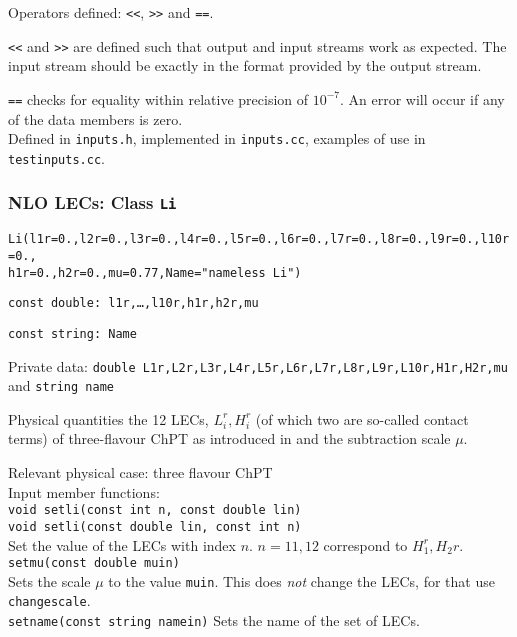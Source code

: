 \documentclass[12pt,a4paper]{article}
\newcommand{\mytt}[1]{\texttt{#1}}
\newcommand{\newfunction}[1]{\mytt{#1}\index{\mytt{#1}}}
\begin{document}
Operators defined: \newfunction{<<}, \newfunction{>>} and \newfunction{==}.

\mytt{<<} and \mytt{>>} are  defined such that output and input
streams work as expected. The input stream should be exactly in the format
provided by the output stream.

\mytt{==} checks for equality within relative precision of $10^{-7}$.
An error will occur if any of the data members is zero.\\

Defined in \mytt{inputs.h}, implemented in \mytt{inputs.cc},
examples of use in \mytt{testinputs.cc}.

\subsubsection{NLO LECs: Class \newfunction{Li}}

\mytt{Li(l1r=0.,l2r=0.,l3r=0.,l4r=0.,l5r=0.,l6r=0.,l7r=0.,l8r=0.,l9r=0.,l10r=0.,\\\hspace*{0.7cm}h1r=0.,h2r=0.,mu=0.77,Name="nameless Li")}

\mytt{const double: l1r,\ldots,l10r,h1r,h2r,mu}

\mytt{const string: Name}


Private data: \mytt{double L1r,L2r,L3r,L4r,L5r,L6r,L7r,L8r,L9r,L10r,H1r,H2r,mu}
and \mytt{string name}

Physical quantities the 12 LECs, $L_i^r,H_i^r$
(of which two are so-called contact terms)
of three-flavour ChPT as introduced in \cite{Gasser:1984gg} and the subtraction
scale $\mu$.

Relevant physical case: three flavour ChPT\\

Input member functions:\\
\mytt{void \newfunction{setli}(const int n, const double lin)}\\
\mytt{void setli(const double lin, const int n)}\\
Set the value of the LECs with index $n$. $n=11,12$ correspond to
$H_1^r,H_2r$.\\
\mytt{\newfunction{setmu}(const double muin)}\\
Sets the scale $\mu$ to the value \mytt{muin}. This does \emph{not}
change the LECs, for that use \mytt{changescale}.\\
\mytt{\newfunction{setname}(const string namein)}
Sets the name of the set of LECs.\\
\end{document}
